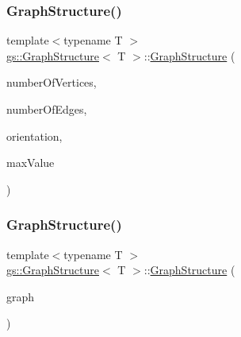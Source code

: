 \subsubsection{\texorpdfstring{Graph\+Structure()}{GraphStructure()}\hspace{0.1cm}{\footnotesize\ttfamily [3/4]}}
{\footnotesize\ttfamily template$<$typename T $>$ \\
\mbox{\hyperlink{classgs_1_1_graph_structure}{gs\+::\+Graph\+Structure}}$<$ T $>$\+::\mbox{\hyperlink{classgs_1_1_graph_structure}{Graph\+Structure}} (\begin{DoxyParamCaption}\item[{std\+::size\+\_\+t}]{number\+Of\+Vertices,  }\item[{std\+::size\+\_\+t}]{number\+Of\+Edges,  }\item[{bool}]{orientation,  }\item[{const T \&}]{max\+Value }\end{DoxyParamCaption})}

\mbox{\label{classgs_1_1_graph_structure_a30f102d272103f65b86945164bd99e0e}} 
\subsubsection{\texorpdfstring{Graph\+Structure()}{GraphStructure()}\hspace{0.1cm}{\footnotesize\ttfamily [4/4]}}
{\footnotesize\ttfamily template$<$typename T $>$ \\
\mbox{\hyperlink{classgs_1_1_graph_structure}{gs\+::\+Graph\+Structure}}$<$ T $>$\+::\mbox{\hyperlink{classgs_1_1_graph_structure}{Graph\+Structure}} (\begin{DoxyParamCaption}\item[{const \mbox{\hyperlink{classgs_1_1_graph_structure}{Graph\+Structure}}$<$ T $>$ \&}]{graph }\end{DoxyParamCaption})}

\mbox{\label{classgs_1_1_graph_structure_aadb408a61239261f483de8d603263475}} 
